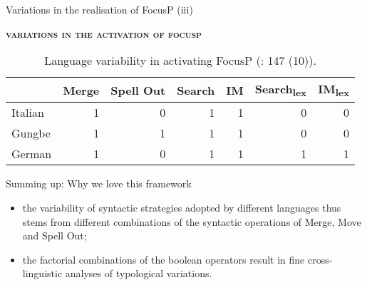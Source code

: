 \documentclass[lesson_slides]{subfiles}
\begin{document}
\begin{frame}[c]{Variations in the realisation of FocusP (iii)}

    \noindent \textbf{\textsc{variations in the activation of focusp}} 
    \begin{table}[H]
    \centering
        \begin{tabular}{|l|r|r|r|r|r|r|}
        \hline
         & Merge & Spell Out & Search & IM & Search\textsubscript{lex} & IM\textsubscript{lex} \\
        \hline
        Italian & 1 & 0 & 1 & 1 & 0 & 0 \\
        \hline
        Gungbe & 1 & 1 & 1 & 1 & 0 & 0 \\
        \hline
        German & 1 & 0 & 1 & 1 & 1 & 1 \\
        \hline
        \end{tabular}
    \caption{\label{tab:samp}Language variability in activating FocusP (\cite{samo2019cartography}: 147 (10)).}
    \end{table}

\end{frame}
\begin{frame}{Summing up: Why we love this framework}

    \begin{itemize}
        \item[\ding{227}] the variability of syntactic strategies adopted by different languages thus stems from different combinations of the syntactic operations of Merge, Move and Spell Out; \pause
        \item[\ding{227}] the factorial combinations of the boolean operators result in fine cross-linguistic analyses of typological variations. 
    \end{itemize}
    
\end{frame}
\end{document}
